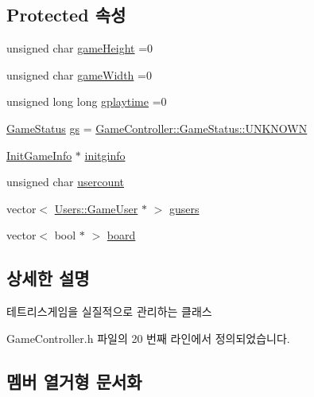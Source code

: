 \subsection*{Protected 속성}
\begin{DoxyCompactItemize}
\item 
unsigned char \hyperlink{class_tetris_1_1_game_controller_a8e3adc647ed382de0ff541417bea9b33}{game\+Height} =0
\item 
unsigned char \hyperlink{class_tetris_1_1_game_controller_a439f215918db4127fcb44cf9d501ed63}{game\+Width} =0
\item 
unsigned long long \hyperlink{class_tetris_1_1_game_controller_a562adcade20e362160535cd7248a2cce}{gplaytime} =0
\item 
\hyperlink{class_tetris_1_1_game_controller_a96a963b56385f3b3a122ff0ca2beb770}{Game\+Status} \hyperlink{class_tetris_1_1_game_controller_ae4c894005a82404c73a5a9a6efb208dc}{gs} = \hyperlink{class_tetris_1_1_game_controller_a96a963b56385f3b3a122ff0ca2beb770a696b031073e74bf2cb98e5ef201d4aa3}{Game\+Controller\+::\+Game\+Status\+::\+U\+N\+K\+N\+O\+WN}
\item 
\hyperlink{class_tetris_1_1_init_game_info}{Init\+Game\+Info} $\ast$ \hyperlink{class_tetris_1_1_game_controller_adaefa9bbdd0d73ec58173dce327373ca}{initginfo}
\item 
unsigned char \hyperlink{class_tetris_1_1_game_controller_aafb18b3b4fe5621bfb60fc42b1e8da09}{usercount}
\item 
vector$<$ \hyperlink{class_tetris_1_1_users_1_1_game_user}{Users\+::\+Game\+User} $\ast$ $>$ \hyperlink{class_tetris_1_1_game_controller_a1a31d3a933daad6d95e20458eea2900e}{gusers}
\item 
vector$<$ bool $\ast$ $>$ \hyperlink{class_tetris_1_1_game_controller_a7725b6cec9459a6bffaa3e29dd1c5196}{board}
\end{DoxyCompactItemize}


\subsection{상세한 설명}
테트리스게임을 실질적으로 관리하는 클래스 

Game\+Controller.\+h 파일의 20 번째 라인에서 정의되었습니다.



\subsection{멤버 열거형 문서화}
\mbox{\label{class_tetris_1_1_game_controller_a96a963b56385f3b3a122ff0ca2beb770}} 
